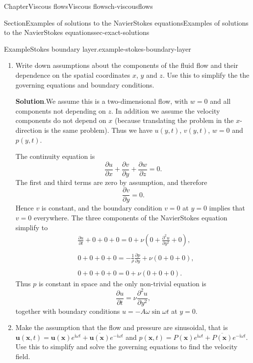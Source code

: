 \documentclass[oneside,10pt,]{book}
\newcommand{\blocktitlefont}{\relax}
\numberwithin{equation}{section}
\newcommand{\im}{\mathrm{i}}
\newcommand{\pd}[2]{\frac{\partial#1}{\partial#2}}
\newcommand{\bx}{\boldsymbol{x}}
\newcommand{\bu}{\boldsymbol{u}}
\newcommand{\bnabla}{\boldsymbol{\nabla}}
\begin{document}
\begin{chapterptx}{Chapter}{Viscous flows}{}{Viscous flows}{}{}{ch-viscousflows}
\begin{sectionptx}{Section}{Examples of solutions to the Navier\textendash{}Stokes equations}{}{Examples of solutions to the Navier\textendash{}Stokes equations}{}{}{sec-exact-solutions}
\begin{example}{Example}{Stokes boundary layer.}{example-stokes-boundary-layer}
\begin{enumerate}[font=\bfseries,label=(\alph*),ref=\alph*]
\begin{equation*}
\pd{\bu}{t}+\bu\cdot\bnabla\bu=-\frac1{\rho}\bnabla p+\nu\nabla^2\bu,\quad
\bnabla\cdot\bu=0.
\end{equation*}
At \(y=0\) the boundary conditions are%
\begin{equation*}
u=-A\omega\sin\omega t,\quad v=w=0.
\end{equation*}
%
\item{}Write down assumptions about the components of the fluid flow and their dependence on the spatial coordinates \(x\), \(y\) and \(z\). Use this to simplify the the governing equations and boundary conditions.%
\par\smallskip%
\noindent\textbf{\blocktitlefont Solution}.\hypertarget{example-stokes-boundary-layer-4-2}{}\quad{}We assume this is a two-dimensional flow, with \(w=0\) and all components not depending on \(z\). In addition we assume the velocity components do not depend on \(x\) (because translating the problem in the \(x\)-direction is the same problem). Thus we have \(u(y,t)\), \(v(y,t)\), \(w=0\) and \(p(y,t)\).%
\par
The continuity equation is%
\begin{equation*}
\pd{u}{x}+\pd{v}{y}+\pd{w}{z}=0.
\end{equation*}
The first and third terms are zero by assumption, and therefore%
\begin{equation*}
\pd{v}{y}=0.
\end{equation*}
Hence \(v\) is constant, and the boundary condition \(v=0\) at \(y=0\) implies that \(v=0\) everywhere. The three components of the Navier\textendash{}Stokes equation simplify to%
\begin{align*}
&\pd{u}{t}+0+0+0=0+\nu\left(0+\pd{^2u}{y^2}+0\right),\\\\
&0+0+0+0=-\frac1{\rho}\pd{p}{y}+\nu\left(0+0+0\right),\\\\
&0+0+0+0=0+\nu\left(0+0+0\right).
\end{align*}
Thus \(p\) is constant in space and the only non-trivial equation is%
\begin{equation*}
\pd{u}{t}=\nu\pd{^2u}{y^2},
\end{equation*}
together with boundary conditions \(u=-A\omega\sin\omega t\) at \(y=0\).%
\item{}Make the assumption that the flow and pressure are sinusoidal, that is \(\bu(\bx,t)=\bu(\bx)e^{\im\omega t}+\overline{\bu(\bx)}e^{-\im\omega t}\) and \(p(\bx,t)=P(\bx)e^{\im\omega t}+\overline{P(\bx)}e^{-\im\omega t}\). Use this to simplify and solve the governing equations to find the velocity field.%

\end{enumerate}
\end{example}
\end{sectionptx}
\end{chapterptx}
\end{document}
